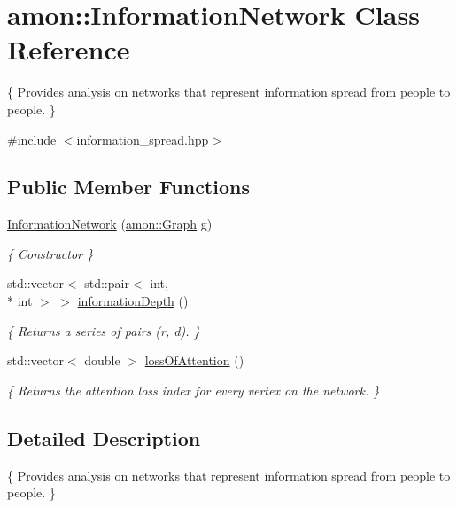 \hypertarget{classamon_1_1_information_network}{\section{amon\-:\-:Information\-Network Class Reference}
\label{classamon_1_1_information_network}
}


\{ Provides analysis on networks that represent information spread from people to people. \}  




{\ttfamily \#include $<$information\-\_\-spread.\-hpp$>$}

\subsection*{Public Member Functions}
\begin{DoxyCompactItemize}
\item 
\hyperlink{classamon_1_1_information_network_ac1ac48f7de78b78667fe432ea98f17b8}{Information\-Network} (\hyperlink{classamon_1_1_graph}{amon\-::\-Graph} g)
\begin{DoxyCompactList}\small\item\em \{ Constructor \} \end{DoxyCompactList}\item 
std\-::vector$<$ std\-::pair$<$ int, \\*
int $>$ $>$ \hyperlink{classamon_1_1_information_network_ae4b4110a07671dda3f0431d36a1d94a7}{information\-Depth} ()
\begin{DoxyCompactList}\small\item\em \{ Returns a series of pairs (r, d). \} \end{DoxyCompactList}\item 
std\-::vector$<$ double $>$ \hyperlink{classamon_1_1_information_network_ac134e23dd425ba9b2fdd3d4ab7206a7d}{loss\-Of\-Attention} ()
\begin{DoxyCompactList}\small\item\em \{ Returns the attention loss index for every vertex on the network. \} \end{DoxyCompactList}\end{DoxyCompactItemize}


\subsection{Detailed Description}
\{ Provides analysis on networks that represent information spread from people to people. \} 

